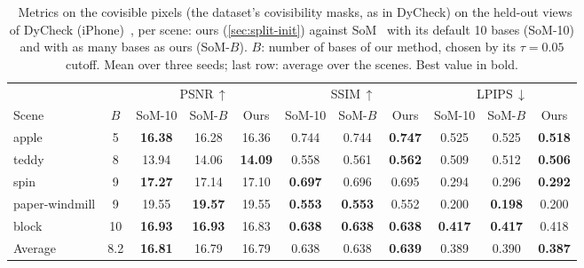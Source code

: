 \begin{table}[t]
  \centering
  \footnotesize
  \setlength{\tabcolsep}{4pt}
  \begin{tabular}{@{}lcccccccccc@{}}
    \toprule
     & & \multicolumn{3}{c}{PSNR\,$\uparrow$} & \multicolumn{3}{c}{SSIM\,$\uparrow$} & \multicolumn{3}{c}{LPIPS\,$\downarrow$} \\
    \cmidrule(lr){3-5} \cmidrule(lr){6-8} \cmidrule(l){9-11}
    Scene & $B$ & SoM-10 & SoM-$B$ & Ours & SoM-10 & SoM-$B$ & Ours & SoM-10 & SoM-$B$ & Ours \\
    \midrule
    apple & 5 & \textbf{16.38} & 16.28 & 16.36 & 0.744 & 0.744 & \textbf{0.747} & 0.525 & 0.525 & \textbf{0.518} \\
    teddy & 8 & 13.94 & 14.06 & \textbf{14.09} & 0.558 & 0.561 & \textbf{0.562} & 0.509 & 0.512 & \textbf{0.506} \\
    spin & 9 & \textbf{17.27} & 17.14 & 17.10 & \textbf{0.697} & 0.696 & 0.695 & 0.294 & 0.296 & \textbf{0.292} \\
    paper-windmill & 9 & 19.55 & \textbf{19.57} & 19.55 & \textbf{0.553} & \textbf{0.553} & 0.552 & 0.200 & \textbf{0.198} & 0.200 \\
    block & 10 & \textbf{16.93} & \textbf{16.93} & 16.83 & \textbf{0.638} & \textbf{0.638} & \textbf{0.638} & \textbf{0.417} & \textbf{0.417} & 0.418 \\
    \midrule
    Average & 8.2 & \textbf{16.81} & 16.79 & 16.79 & 0.638 & 0.638 & \textbf{0.639} & 0.389 & 0.390 & \textbf{0.387} \\
    \bottomrule
  \end{tabular}
  \caption{\claudetag\ Metrics on the covisible pixels (the dataset's covisibility masks, as in DyCheck) on the held-out views of DyCheck (iPhone)~\cite{gao2022dynamic}, per scene: ours
    (\cref{sec:split-init}) against SoM~\cite{wang2025shape} with its default 10 bases (SoM-10) and with as many bases
    as ours (SoM-$B$). $B$: number of bases of our method, chosen by its $\tau = 0.05$ cutoff. Mean over three seeds; last row: average over the scenes.
    Best value in bold. }
  \label{tab:full-dycheck}
\end{table}
